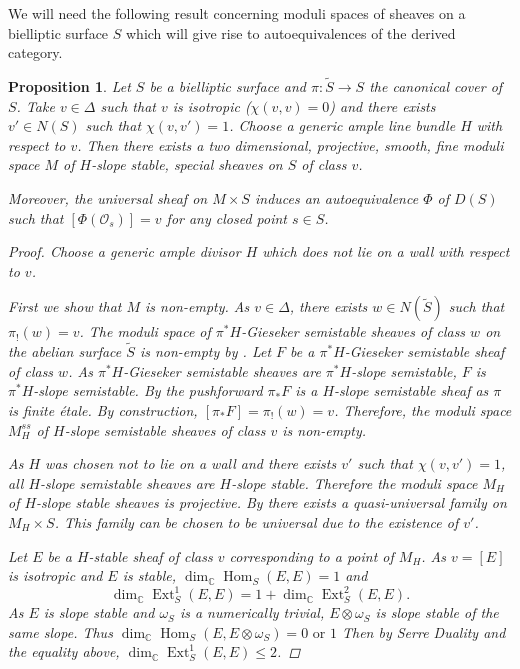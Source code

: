 \documentclass[a4paper, 12pt, twoside]{amsart}
\theoremstyle{plain}
\newtheorem{proposition}[theorem]{Proposition}
\theoremstyle{definition}
\DeclareMathOperator{\Ext}{Ext}
\DeclareMathOperator{\Hom}{Hom}
\DeclareMathOperator{\C}{\mathbb{C}}
\begin{document}
We will need the following result concerning moduli spaces of sheaves
on a bielliptic surface $S$ which will give rise to autoequivalences
of the derived category.

\begin{proposition}\label{prop:moduli}
  Let $S$ be a bielliptic surface and $\pi \colon \widetilde{S} \to S$
  the canonical cover of $S$. Take $v \in \Delta$ such that $v$ is
  isotropic ($\chi(v,v) = 0$) and there exists $v' \in N(S)$ such that
  $\chi(v,v')=1$. Choose a generic ample line bundle $H$ with respect
  to $v$. Then there exists a two dimensional, projective, smooth,
  fine moduli space $M$ of $H$-slope stable, special sheaves on $S$ of
  class $v$.

  Moreover, the universal sheaf on $M \times S$ induces an
  autoequivalence $\Phi$ of $D(S)$ such that
  $[\Phi(\mathcal{O}_s)] = v$ for any closed point $s \in S$.

  \begin{proof}
    Choose a generic ample divisor $H$ which does not lie on a wall
    with respect to $v$.
 
    First we show that $M$ is non-empty. As $v \in \Delta$, there
    exists $w \in N(\widetilde{S})$ such that $\pi_!(w)=v$. The moduli
    space of $\pi^*H$-Gieseker semistable sheaves of class $w$ on the
    abelian surface $\widetilde{S}$ is non-empty by \cite[\S
    4.3]{MR2665168}. Let $F$ be a $\pi^*H$-Gieseker semistable sheaf
    of class $w$. As $\pi^*H$-Gieseker semistable sheaves are
    $\pi^*H$-slope semistable, $F$ is $\pi^*H$-slope semistable. By
    \cite[Proposition 1.5]{MR0337967} the pushforward $\pi_*F$ is a
    $H$-slope semistable sheaf as $\pi$ is finite \'{e}tale. By
    construction, $[\pi_*F] = \pi_!(w) = v$.  Therefore, the moduli
    space $M_H^{ss}$ of $H$-slope semistable sheaves of class $v$ is
    non-empty.

    As $H$ was chosen not to lie on a wall and there exists $v'$ such
    that $\chi(v,v') =1 $, all $H$-slope semistable sheaves are
    $H$-slope stable. Therefore the moduli space $M_H$ of $H$-slope
    stable sheaves is projective. By \cite[Proposition 4.6]{MR2665168}
    there exists a quasi-universal family on $M_H \times S$. This
    family can be chosen to be universal due to the existence of $v'$.

    Let $E$ be a $H$-stable sheaf of class $v$ corresponding to a
    point of $M_H$. As $v = [E]$ is isotropic and $E$ is stable,
    $\dim_{\C}\Hom_S(E,E) =1$ and
    \[
      \dim_{\C}\Ext_S^1(E,E) = 1 + \dim_{\C}\Ext_S^2(E,E).
    \]
    As $E$ is slope stable and $\omega_S$ is a numerically trivial,
    $E \otimes \omega_S$ is slope stable of the same slope. Thus
    $\dim_{\C} \Hom_S(E,E \otimes \omega_S) = 0 \text{ or }1$ Then by
    Serre Duality and the equality above,
    $\dim_{\C} \Ext^1_S(E,E) \leq 2$.


\end{proof}
\end{proposition}
\end{document}
